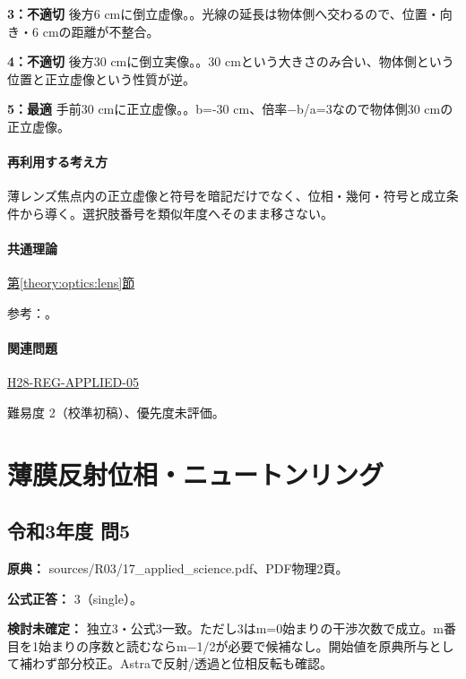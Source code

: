 \noindent\textbf{3：不適切} 後方6 cmに倒立虚像。。光線の延長は物体側へ交わるので、位置・向き・6 cmの距離が不整合。\par

\noindent\textbf{4：不適切} 後方30 cmに倒立実像。。30 cmという大きさのみ合い、物体側という位置と正立虚像という性質が逆。\par

\noindent\textbf{5：最適} 手前30 cmに正立虚像。。b=-30 cm、倍率−b/a=\allowbreak{}3なので物体側30 cmの正立虚像。\par

\paragraph{再利用する考え方} 薄レンズ焦点内の正立虚像と符号を暗記だけでなく、位相・幾何・符号と成立条件から導く。選択肢番号を類似年度へそのまま移さない。

\paragraph{共通理論} \hyperref[theory:optics:lens]{第\ref*{theory:optics:lens}節}

\par 参考：\cite{os_lens}。

\paragraph{関連問題} \hyperref[q:h28-reg-applied-05]{H28-REG-APPLIED-05}

\par 難易度 2（校準初稿）、優先度未評価。

\section{薄膜反射位相・ニュートンリング}

\subsection{令和3年度 問5}
\label{q:r03-reg-applied-05}

\noindent\textbf{原典：} sources/R03/17\_applied\_science.pdf、PDF物理2頁。

\textbf{公式正答：} 3（single）。

\par\textbf{検討未確定：} 独立3・公式3一致。ただし3はm=\allowbreak{}0始まりの干渉次数で成立。m番目を1始まりの序数と読むならm−1/2が必要で候補なし。開始値を原典所与として補わず部分校正。Astraで反射/透過と位相反転も確認。

